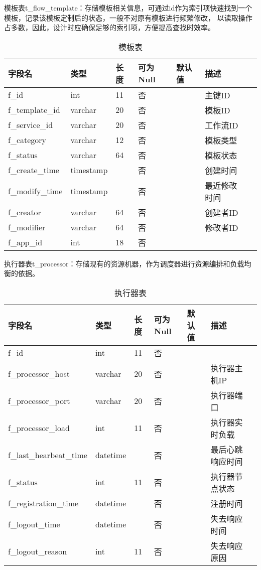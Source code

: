 模板表t\_flow\_template：存储模板相关信息，可通过id作为索引项快速找到一个模板，记录该模板定制后的状态，一般不对原有模板进行频繁修改，
以读取操作占多数，因此，设计时应确保足够的索引项，方便提高查找时效率。
\begin{table}[H]
    \centering
    \caption{模板表}
    \label{tab:t_flow_template}
    \begin{tabular}{lllllll}
        \toprule
        字段名	&类型	&长度	&可为Null&默认值	&描述 \\
        \midrule
        f\_id	&int	&11 &否&&主键ID \\
        f\_template\_id	&varchar	&20 &否&&模板ID \\
        f\_service\_id	&varchar	&20 &否&&工作流ID \\
        f\_category	&varchar	&12 &否&&模板类型 \\
        f\_status	&varchar	&64 &否&&模板状态 \\
        f\_create\_time	&timestamp & &否&&创建时间 \\
        f\_modify\_time   &timestamp & &否&&最近修改时间 \\
        f\_creator	&varchar	&64 &否&&创建者ID \\
        f\_modifier	&varchar	&64 &否&&修改者ID \\
        f\_app\_id	&int	&18 &否&& \\
        \bottomrule
    \end{tabular}
\end{table}

执行器表t\_processor：存储现有的资源机器，作为调度器进行资源编排和负载均衡的依据。
\begin{table}[H]
    \centering
    \caption{执行器表}
    \label{tab:t_processor}
    \begin{tabular}{lllllll}
        \toprule
        字段名	&类型	&长度	&可为Null &默认值	&描述 \\
        \midrule
        f\_id	&int	&11 &否&& \\
        f\_processor\_host	&varchar	&20 &否&& 执行器主机IP\\
        f\_processor\_port	&varchar	&20 &否&& 执行器端口\\
        f\_processor\_load	&int	&11 &否&& 执行器实时负载\\
        f\_last\_hearbeat\_time	&datetime &&否&& 最后心跳响应时间\\
        f\_status	&int	&11 &否&& 执行器节点状态\\
        f\_registration\_time	&datetime &&否&& 注册时间\\
        f\_logout\_time	&datetime &&否&& 失去响应时间\\
        f\_logout\_reason	&int	&11 &否&& 失去响应原因\\
        \bottomrule
    \end{tabular}
\end{table}

